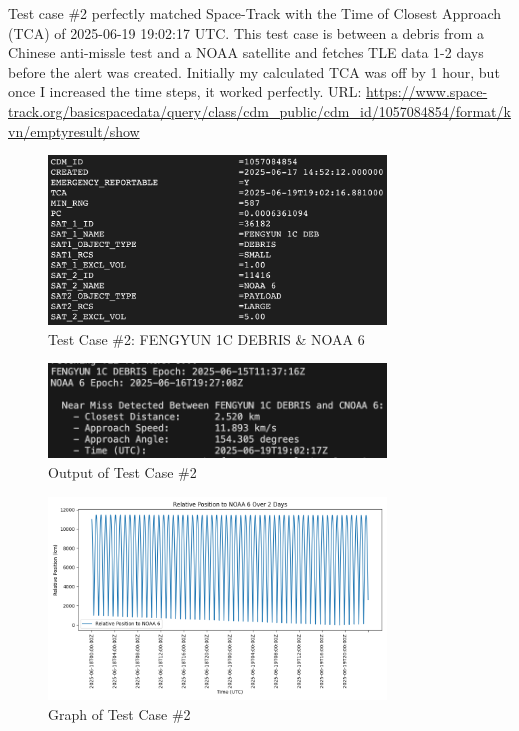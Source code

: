 \documentclass[12pt]{report}
\begin{document}
\begin{enumerate}
  Test case \#2 perfectly matched Space-Track with the Time of Closest Approach (TCA) of 2025-06-19 19:02:17 UTC. This test case is between a debris from a Chinese anti-missle test and a NOAA satellite and fetches TLE data 1-2 days before the alert was created.
  Initially my calculated TCA was off by 1 hour, but once I increased the time steps, it worked perfectly.
  \newline
  URL: \url{https://www.space-track.org/basicspacedata/query/class/cdm_public/cdm_id/1057084854/format/kvn/emptyresult/show}
  \newline
  \begin{figure}[H]
    \centering
    \includegraphics[width=0.8\textwidth]{figure_week_5_test2.png}
    \caption{Test Case \#2: FENGYUN 1C DEBRIS \& NOAA 6}
    \label{fig:test_case_2}
  \end{figure}

  \begin{figure}[H]
    \centering
    \includegraphics[width=0.8\textwidth]{figure_week_5_test2-output.png}
    \caption{Output of Test Case \#2}
    \label{fig:test_case_2_output}
  \end{figure}

  \begin{figure}[H]
    \centering
    \includegraphics[width=0.8\textwidth]{figure_week_5_test2-graph.png}
    \caption{Graph of Test Case \#2}
    \label{fig:test_case_2_graph}
  \end{figure}


\end{enumerate}
\end{document}
